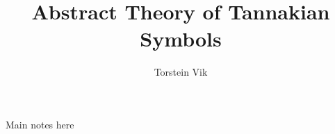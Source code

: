 \documentclass[a4paper]{amsart}
\title{Abstract Theory of Tannakian Symbols}
\author{Torstein Vik}
\begin{document}
Main notes here 
\maketitle
\tableofcontents

\newpage
\end{document}
